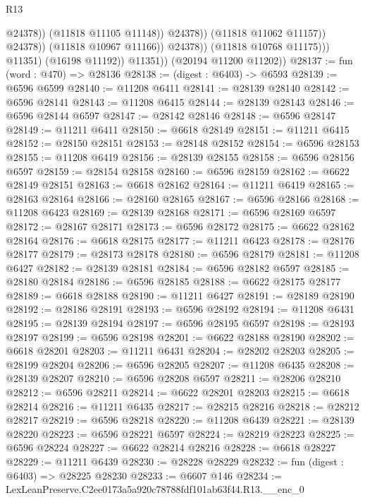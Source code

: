 \begin{lexlean}{R13}
\begin{coremodule}
                                        @24378))
                                    (@11818 @11105 @11148))
                                  @24378))
                              (@11818 @11062 @11157))
                            @24378))
                        (@11818 @10967 @11166))
                      @24378))
                  (@11818 @10768 @11175)))
              @11351)
            (@16198 @11192))
          @11351))
      (@20194 @11200 @11202))
@28137 := fun (word : @470) => @28136
@28138 := (digest : @6403) -> @6593
@28139 := @6596 @6599
@28140 := @11208 @6411
@28141 := @28139 @28140
@28142 := @6596 @28141
@28143 := @11208 @6415
@28144 := @28139 @28143
@28146 := @6596 @28144 @6597
@28147 := @28142 @28146
@28148 := @6596 @28147
@28149 := @11211 @6411
@28150 := @6618 @28149
@28151 := @11211 @6415
@28152 := @28150 @28151
@28153 := @28148 @28152
@28154 := @6596 @28153
@28155 := @11208 @6419
@28156 := @28139 @28155
@28158 := @6596 @28156 @6597
@28159 := @28154 @28158
@28160 := @6596 @28159
@28162 := @6622 @28149 @28151
@28163 := @6618 @28162
@28164 := @11211 @6419
@28165 := @28163 @28164
@28166 := @28160 @28165
@28167 := @6596 @28166
@28168 := @11208 @6423
@28169 := @28139 @28168
@28171 := @6596 @28169 @6597
@28172 := @28167 @28171
@28173 := @6596 @28172
@28175 := @6622 @28162 @28164
@28176 := @6618 @28175
@28177 := @11211 @6423
@28178 := @28176 @28177
@28179 := @28173 @28178
@28180 := @6596 @28179
@28181 := @11208 @6427
@28182 := @28139 @28181
@28184 := @6596 @28182 @6597
@28185 := @28180 @28184
@28186 := @6596 @28185
@28188 := @6622 @28175 @28177
@28189 := @6618 @28188
@28190 := @11211 @6427
@28191 := @28189 @28190
@28192 := @28186 @28191
@28193 := @6596 @28192
@28194 := @11208 @6431
@28195 := @28139 @28194
@28197 := @6596 @28195 @6597
@28198 := @28193 @28197
@28199 := @6596 @28198
@28201 := @6622 @28188 @28190
@28202 := @6618 @28201
@28203 := @11211 @6431
@28204 := @28202 @28203
@28205 := @28199 @28204
@28206 := @6596 @28205
@28207 := @11208 @6435
@28208 := @28139 @28207
@28210 := @6596 @28208 @6597
@28211 := @28206 @28210
@28212 := @6596 @28211
@28214 := @6622 @28201 @28203
@28215 := @6618 @28214
@28216 := @11211 @6435
@28217 := @28215 @28216
@28218 := @28212 @28217
@28219 := @6596 @28218
@28220 := @11208 @6439
@28221 := @28139 @28220
@28223 := @6596 @28221 @6597
@28224 := @28219 @28223
@28225 := @6596 @28224
@28227 := @6622 @28214 @28216
@28228 := @6618 @28227
@28229 := @11211 @6439
@28230 := @28228 @28229
@28232 := fun (digest : @6403) => @28225 @28230
@28233 := @6607 @146
@28234 := LexLeanPreserve.C2ee0173a5a920c78788fdf101ab63f44.R13.__enc_0

\end{coremodule}
\end{lexlean}
